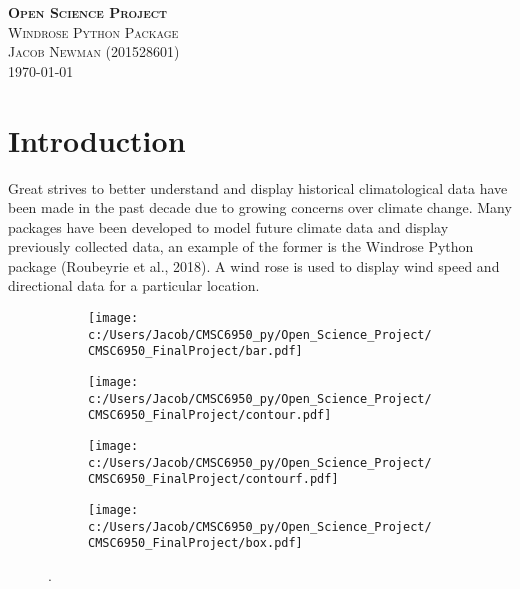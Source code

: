 \documentclass{article}
\begin{document}
\begin{titlepage}
\newcommand{\HRule}{\rule{\linewidth}{0.5mm}}

\center
\textsc{\LARGE \textbf{Open Science Project}}\\[1 cm]

\textsc{\Large Windrose Python Package}\\[0.5 cm]

\textsc{\large Jacob Newman (201528601)}\\[0.5 cm]





\vfill\vfill\vfill
{\large\today}
\vfill

\end{titlepage}


\section{Introduction}\label{Introduction}
Great strives to better understand and display historical climatological data have been made in the past decade due to growing concerns over climate change. Many packages have been developed to model 
future climate data and display previously collected data, an example of the former is the Windrose Python package (Roubeyrie et al., 2018). A wind rose is used to display wind speed and directional data 
for a particular location.  

\begin{figure}[h!]
\begin{subfigure}{.5\textwidth}
\centering
\texttt{[image: c:/Users/Jacob/CMSC6950\_py/Open\_Science\_Project/CMSC6950\_FinalProject/bar.pdf]}
\label{bar_windrose}
\end{subfigure}
\begin{subfigure}{.5\textwidth}
\centering
\texttt{[image: c:/Users/Jacob/CMSC6950\_py/Open\_Science\_Project/CMSC6950\_FinalProject/contour.pdf]}
\label{contour}
\end{subfigure}
\begin{subfigure}{.5\textwidth}
\centering
\texttt{[image: c:/Users/Jacob/CMSC6950\_py/Open\_Science\_Project/CMSC6950\_FinalProject/contourf.pdf]}
\label{contourf_windrose}
\end{subfigure}
\begin{subfigure}{.5\textwidth}
\centering
\texttt{[image: c:/Users/Jacob/CMSC6950\_py/Open\_Science\_Project/CMSC6950\_FinalProject/box.pdf]}
\label{box_windrose}
\end{subfigure}
\label{windrose_diagrams}
\caption{.}
\end{figure}
\end{document}
